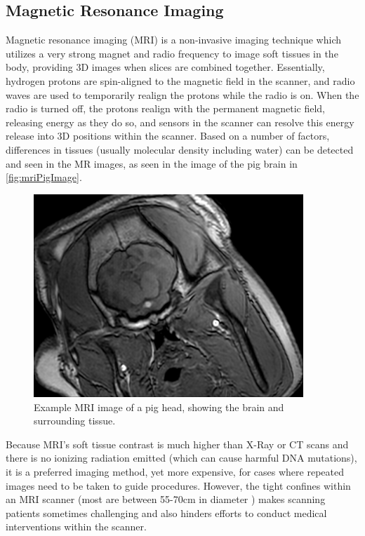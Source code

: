 \documentclass[12pt]{report}
\begin{document}
\subsection{Magnetic Resonance Imaging}
Magnetic resonance imaging (MRI) is a non-invasive imaging technique which utilizes a very strong magnet and radio frequency to image soft tissues in the body, providing 3D images when slices are combined together. \cite{mri} Essentially, hydrogen protons are spin-aligned to the magnetic field in the scanner, and radio waves are used to temporarily realign the protons while the radio is on. When the radio is turned off, the protons realign with the permanent magnetic field, releasing energy as they do so, and sensors in the scanner can resolve this energy release into 3D positions within the scanner. Based on a number of factors, differences in tissues (usually molecular density including water) can be detected and seen in the MR images, as seen in the image of the pig brain in \autoref{fig:mriPigImage}. 

\begin{figure}[thpb]
	\centering
	\includegraphics[width=4in]{images/MRI_scan_pig_brain.png}
    \caption{Example MRI image of a pig head, showing the brain and surrounding tissue.}
    \label{fig:mriPigImage}
\end{figure}

Because MRI's soft tissue contrast is much higher than X-Ray or CT scans and there is no ionizing radiation emitted (which can cause harmful DNA mutations), it is a preferred imaging method, yet more expensive, for cases where repeated images need to be taken to guide procedures. However, the tight confines within an MRI scanner (most are between 55-70cm in diameter \cite{mriSize}) makes scanning patients sometimes challenging and also hinders efforts to conduct medical interventions within the scanner. 
\end{document}
